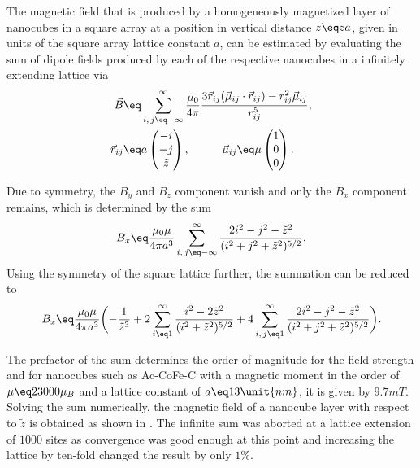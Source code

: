 \documentclass[\main/dresen_thesis.tex]{subfiles}
\begin{document}
  \label{sec:doublelayers:magnetism:intro}
  The magnetic field that is produced by a homogeneously magnetized layer of nanocubes in a square array at a position in vertical distance $z \eq \tilde{z} a$, given in units of the square array lattice constant $a$, can be estimated by evaluating the sum of dipole fields produced by each of the respective nanocubes in a infinitely extending lattice via
  \begin{align}
    \begin{split}
      \vec{B} \eq& \sum_{i,\, j \eq -\infty}^\infty \frac{\mu_0}{4 \pi} \frac{3 \vec{r}_{ij} (\vec{\mu}_{ij} \cdot \vec{r}_{ij}) - r_{ij}^2 \vec{\mu}_{ij}}{r_{ij}^5},\\
      \vec{r}_{ij} \eq& a \begin{pmatrix}-i\\-j\\\tilde{z}\end{pmatrix}, \hspace{1cm}
      \vec{\mu}_{ij} \eq \mu \begin{pmatrix}1\\0\\0\end{pmatrix}.
    \end{split}
  \end{align}

  Due to symmetry, the $B_y$ and $B_z$ component vanish and only the $B_x$ component remains, which is determined by the sum
  \begin{align}
    B_x \eq& \frac{\mu_0 \mu}{4 \pi a^3} \sum_{i,\, j \eq -\infty}^\infty  \frac{2 i^2 - j^2 - \tilde{z}^2}{(i^2 + j^2 + \tilde{z}^2)^{5/2}}.\\
  \end{align}
  Using the symmetry of the square lattice further, the summation can be reduced to
  \begin{align}
    B_x \eq& \frac{\mu_0 \mu}{4 \pi a^3} \biggl( -\frac{1}{\tilde{z}^3} + 2 \sum_{i \eq 1}^\infty \frac{i^2 - 2\tilde{z}^2}{(i^2 + \tilde{z}^2)^{5/2}} + 4 \sum_{i,\, j \eq 1}^\infty  \frac{2 i^2 - j^2 - \tilde{z}^2}{(i^2 + j^2 + \tilde{z}^2)^{5/2}} \biggr).\\
  \end{align}

  The prefactor of the sum determines the order of magnitude for the field strength and for nanocubes such as Ac-CoFe-C with a magnetic moment in the order of $\mu \eq 23000 \mu_B$ and a lattice constant of $a \eq 13 \unit{nm}$, it is given by $9.7 \unit{mT}$.
  Solving the sum numerically, the magnetic field of a nanocube layer with respect to $\tilde{z}$ is obtained as shown in .
  The infinite sum was aborted at a lattice extension of $1000$ sites as convergence was good enough at this point and increasing the lattice by ten-fold changed the result by only $1\%$.
\end{document}
